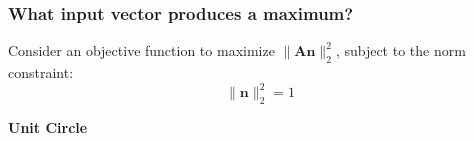 \documentclass[aspectratio=169]{beamer}
\begin{document}
\begin{frame}
\frametitle{What input vector produces a maximum?}
Consider an objective function to maximize \( \| \mathbf{A} \mathbf{n} \|_2^2\), subject to the norm constraint:
\[
\|\mathbf{n}\|_2^2 = 1
\] \pause

\centering
        \textbf{Unit Circle}\\[0.5cm]
        

\end{frame}
\end{document}

